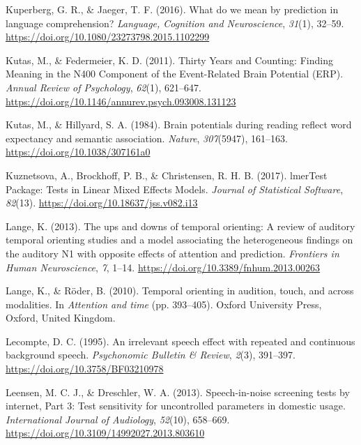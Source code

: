 \documentclass[a4paper, nobind]{templates/ociamthesis}
\newlength{\cslhangindent}
\newenvironment{CSLReferences}[2] %
 {%
  \setlength{\parindent}{0pt}
  \ifodd #1
  \let\oldpar\par
  \def\par{\hangindent=\cslhangindent\oldpar}
  \fi
  \setlength{\parskip}{1mm}
  \setlength{\baselineskip}{6mm}
 }%
 {}
\begin{document}
\begin{CSLReferences}{1}{0}
\leavevmode{}%
Kuperberg, G. R., \& Jaeger, T. F. (2016). What do we mean by prediction in language comprehension? \emph{Language, Cognition and Neuroscience}, \emph{31}(1), 32--59. \url{https://doi.org/10.1080/23273798.2015.1102299}

\leavevmode{}%
Kutas, M., \& Federmeier, K. D. (2011). Thirty Years and Counting: Finding Meaning in the N400 Component of the Event-Related Brain Potential (ERP). \emph{Annual Review of Psychology}, \emph{62}(1), 621--647. \url{https://doi.org/10.1146/annurev.psych.093008.131123}

\leavevmode{}%
Kutas, M., \& Hillyard, S. A. (1984). Brain potentials during reading reflect word expectancy and semantic association. \emph{Nature}, \emph{307}(5947), 161--163. \url{https://doi.org/10.1038/307161a0}

\leavevmode{}%
Kuznetsova, A., Brockhoff, P. B., \& Christensen, R. H. B. (2017). lmerTest Package: Tests in Linear Mixed Effects Models. \emph{Journal of Statistical Software}, \emph{82}(13). \url{https://doi.org/10.18637/jss.v082.i13}

\leavevmode{}%
Lange, K. (2013). {The ups and downs of temporal orienting: A review of auditory temporal orienting studies and a model associating the heterogeneous findings on the auditory N1 with opposite effects of attention and prediction}. \emph{Frontiers in Human Neuroscience}, \emph{7}, 1--14. \url{https://doi.org/10.3389/fnhum.2013.00263}

\leavevmode{}%
Lange, K., \& Röder, B. (2010). Temporal orienting in audition, touch, and across modalities. In \emph{Attention and time} (pp. 393--405). Oxford University Press, Oxford, United Kingdom.

\leavevmode{}%
Lecompte, D. C. (1995). An irrelevant speech effect with repeated and continuous background speech. \emph{Psychonomic Bulletin \& Review}, \emph{2}(3), 391--397. \url{https://doi.org/10.3758/BF03210978}

\leavevmode{}%
Leensen, M. C. J., \& Dreschler, W. A. (2013). {Speech-in-noise screening tests by internet, Part 3: Test sensitivity for uncontrolled parameters in domestic usage}. \emph{International Journal of Audiology}, \emph{52}(10), 658--669. \url{https://doi.org/10.3109/14992027.2013.803610}


\end{CSLReferences}
\end{document}
